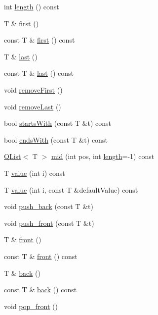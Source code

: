 \begin{DoxyCompactItemize}
int \hyperlink{class_q_list_ac1755c03849804156e624efcd6562874}{length} () const 
\item 
T \& \hyperlink{class_q_list_a0d91b8dcfdf240b85c2349f339021cfa}{first} ()
\item 
const T \& \hyperlink{class_q_list_ae6dd7daa61bc35d4087d86ed48a94483}{first} () const 
\item 
T \& \hyperlink{class_q_list_a0e12e5e4af39fe20f860fe88a4fbc258}{last} ()
\item 
const T \& \hyperlink{class_q_list_aea03869b849a94805b4f32efcfb91f6c}{last} () const 
\item 
void \hyperlink{class_q_list_a46dbbac39b9f24f1d4432a40dfea58e7}{remove\+First} ()
\item 
void \hyperlink{class_q_list_a755672d6b82fc61e949a5b803b531855}{remove\+Last} ()
\item 
bool \hyperlink{class_q_list_a6f3ab95623c1be43d05579604e9725c3}{starts\+With} (const T \&t) const 
\item 
bool \hyperlink{class_q_list_a56fc27955aa88be311fcc586b90ec1b7}{ends\+With} (const T \&t) const 
\item 
\hyperlink{class_q_list}{Q\+List}$<$ T $>$ \hyperlink{class_q_list_a92da113812831b97bac90aec3e49ec4f}{mid} (int pos, int \hyperlink{class_q_list_ac1755c03849804156e624efcd6562874}{length}=-\/1) const 
\item 
T \hyperlink{class_q_list_a3b4873989858726d6c67ee0c2cef23f9}{value} (int i) const 
\item 
T \hyperlink{class_q_list_a069f4168424cb4ea5fa737845e0344c5}{value} (int i, const T \&default\+Value) const 
\item 
void \hyperlink{class_q_list_a23747ae8cb19b7e4bf24de944aa97bf2}{push\+\_\+back} (const T \&t)
\item 
void \hyperlink{class_q_list_aa0ffa16b4f92679d5d8f96fbaf872b0a}{push\+\_\+front} (const T \&t)
\item 
T \& \hyperlink{class_q_list_abfdbbac7bf0f4bb038a4970e526a16dd}{front} ()
\item 
const T \& \hyperlink{class_q_list_a4e8454fbc329f687de1a4f4521fc6014}{front} () const 
\item 
T \& \hyperlink{class_q_list_a7083f8e5508d1e9d3fcd0e08e2e5856b}{back} ()
\item 
const T \& \hyperlink{class_q_list_ad594bd054a766853a55ab37dede212fb}{back} () const 
\item 
void \hyperlink{class_q_list_a962412c448917350122d257ffe589f72}{pop\+\_\+front} ()
\item 

\end{DoxyCompactItemize}
